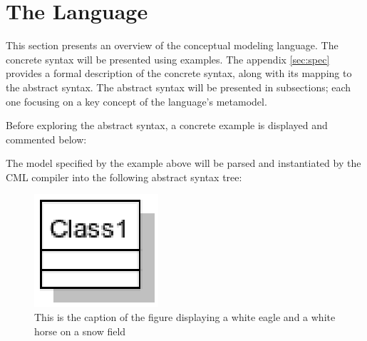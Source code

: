 \section{The Language}\label{sec:lang}
%
This section presents an overview of the conceptual modeling language.
The concrete syntax will be presented using examples.
The appendix \ref{sec:spec} provides a formal description of the concrete syntax, along with its mapping to the abstract syntax.
The abstract syntax will be presented in subsections; each one focusing on a key concept of the language's metamodel.

Before exploring the abstract syntax, a concrete example is displayed and commented below:



The model specified by the example above will be parsed and instantiated by the CML compiler into the following abstract syntax tree:

\begin{figure}
\centering
\includegraphics{language/main}
\caption{This is the caption of the figure displaying a white eagle and
a white horse on a snow field}
\end{figure}
